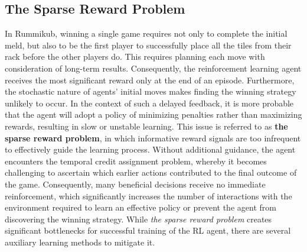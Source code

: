 
\subsection{The Sparse Reward Problem}
\label{Enhancement_tech_2}
In Rummikub, winning a single game requires not only to complete the initial meld, but also to be the first player to successfully place all the tiles from their rack before the other players do. This requires planning each move with consideration of long-term results. Consequently, the reinforcement learning agent receives the most significant reward only at the end of an episode. Furthermore, the stochastic nature of agents' initial moves makes finding the winning strategy unlikely to occur.
In the context of such a delayed feedback, it is more probable that the agent will adopt a policy of minimizing penalties rather than maximizing rewards, resulting in slow or unstable learning. This issue is referred to as \textbf{the sparse reward problem}, in which informative reward signals are too infrequent to effectively guide the learning process. Without additional guidance, the agent encounters the temporal credit assignment problem, whereby it becomes challenging to ascertain which earlier actions contributed to the final outcome of the game. Consequently, many beneficial decisions receive no immediate reinforcement, which significantly increases the number of interactions with the environment required to learn an effective policy or prevent the agent from discovering the winning strategy. 
While \textit{the sparse reward problem} creates significant bottlenecks for successful training of the RL agent, there are several auxiliary learning methods to mitigate it.
